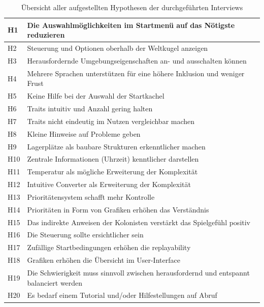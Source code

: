 \begin{table}[]
    \centering
    \caption{Übersicht aller aufgestellten Hypothesen der durchgeführten Interviews}
    \label{table:hypotheses}
    \begin{tabular}{|l|l|}
    \hline
    H1 & Die Auswahlmöglichkeiten im Startmenü auf das Nötigste reduzieren         \\ \hline
    H2 & Steuerung und Optionen oberhalb der Weltkugel anzeigen                    \\ \hline
    H3 & Herausfordernde Umgebungseigenschaften an- und ausschalten können         \\ \hline
    H4 & Mehrere Sprachen unterstützen für eine höhere Inklusion und weniger Frust \\ \hline
    H5 & Keine Hilfe bei der Auswahl der Startkachel                               \\ \hline
    H6 & Traits intuitiv und Anzahl gering halten                               \\ \hline
    H7 & Traits nicht eindeutig im Nutzen vergleichbar machen                               \\ \hline
    H8 & Kleine Hinweise auf Probleme geben                              \\ \hline
    H9 & Lagerplätze als baubare Strukturen erkenntlicher machen                              \\ \hline
    H10 & Zentrale Informationen (Uhrzeit) kenntlicher darstellen                             \\ \hline
    H11 & Temperatur als mögliche Erweiterung der Komplexität                             \\ \hline
    H12 & Intuitive Converter als Erweiterung der Komplexität                             \\ \hline
    H13 & Prioritätensystem schafft mehr Kontrolle                             \\ \hline
    H14 & Prioritäten in Form von Grafiken erhöhen das Verständnis                             \\ \hline
    H15 & Das indirekte Anweisen der Kolonisten verstärkt das Spielgefühl positiv                            \\ \hline
    H16 & Die Steuerung sollte ersichtlicher sein   \\ \hline
    H17 & Zufällige Startbedingungen erhöhen die replayability                            \\ \hline
    H18 & Grafiken erhöhen die Übersicht im User-Interface                            \\ \hline
    H19 & Die Schwierigkeit muss sinnvoll zwischen herausfordernd und entspannt balanciert werden                            \\ \hline
    H20 & Es bedarf einem Tutorial und/oder Hilfestellungen auf Abruf                            \\ \hline
    \end{tabular}
    \end{table}